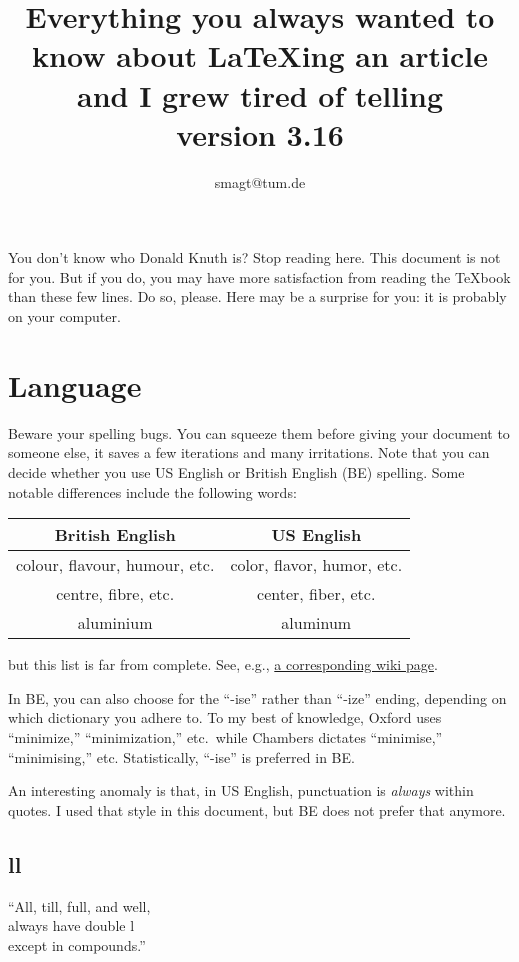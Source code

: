 \documentclass{article}
\title{Everything you always wanted to know about \LaTeX ing an article and I grew tired of telling\\[1ex]
\footnotesize{version 3.16}}
\author{smagt@tum.de}
\begin{document}
\maketitle

You don't know who Donald Knuth is?  Stop reading here.  This document is not for you.  But if you do,
you may have more satisfaction from reading the \TeX book than these few lines.   Do so, please.
Here may be a surprise for you: it is probably on your computer.

\section{Language}
Beware your spelling bugs.  You can squeeze them before giving your document to someone else, it saves
a few iterations and many irritations.  Note that you can decide whether you use US English or
British English (BE) spelling.  Some notable differences include the following words:
\begin{center}\begin{tabular}{c|c}
British English & US English \\\hline
colour, flavour, humour, etc.	& color, flavor, humor, etc.\\
centre, fibre, etc.	& center, fiber, etc.\\
aluminium			& aluminum
\end{tabular}\end{center}
but this list is far from complete.  See, e.g., \href{http://en.wikipedia.org/wiki/American_and_British_English_spelling_differences}{a corresponding wiki page}.

In BE, you can also choose for the ``-ise'' rather than ``-ize'' ending, depending on which
dictionary you adhere to.  To my best of knowledge, Oxford uses ``minimize,'' ``minimization,'' etc.\
while Chambers dictates ``minimise,'' ``minimising,'' etc.  Statistically, ``-ise'' is preferred in BE.

An interesting anomaly is that, in US English, punctuation is \textsl{always} within quotes.  
I used that style in this document, but BE does not prefer that anymore.


\subsection{ll}
``All, till, full, and well, \\
always have double l\\
except in compounds.''
\end{document}
